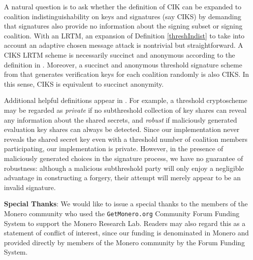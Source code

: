 \documentclass{mrl}
\theoremstyle{definition}
\begin{document}
A natural question is to ask whether the definition of CIK can be expanded to coalition indistinguishability on keys and signatures (say CIKS) by demanding that signatures also provide no information about the signing subset or signing coalition.  With an LRTM, an expansion of Definition \ref{threshIndist} to take into account an adaptive chosen message attack is nontrivial but straightforward. A CIKS LRTM scheme is necessarily succinct and anonymous according to the definition in \cite{bonehthreshold}. Moreover, a succinct and anonymous threshold signature scheme from \cite{bonehthreshold} that generates verification keys for each coalition randomly is also CIKS. In this sense, CIKS is equivalent to succinct anonymity. 


Additional helpful definitions appear in \cite{bonehthreshold}. For example, a threshold cryptoscheme may be regarded as \textit{private} if no subthreshold collection of key shares can reveal any information about the shared secrets, and \textit{robust} if maliciously generated evaluation key shares can always be detected. Since our implementation never reveals the shared secret key even with a threshold number of coalition members participating, our implementation is private. However, in the presence of maliciously generated choices in the signature process, we have no guarantee of robustness: although a malicious subthreshold party will only enjoy a negligible advantage in constructing a forgery, their attempt will merely appear to be an invalid signature.

\vspace{0.1in}

\textbf{Special Thanks}: We would like to issue a special thanks to the members of the Monero community who used the \texttt{GetMonero.org} Community Forum Funding System to support the Monero Research Lab. Readers may also regard this as a statement of conflict of interest, since our funding is denominated in Monero and provided directly by members of the Monero community by the Forum Funding System.

\medskip{}



\end{document}
